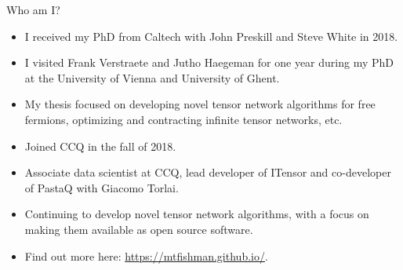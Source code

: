 \begin{frame}{Who am I?}

\begin{itemize}[<+->]

  \item I received my PhD from Caltech with John Preskill and Steve White in 2018.
  \item I visited Frank Verstraete and Jutho Haegeman for one year during my PhD at the University of Vienna and University of Ghent.
  \item My thesis focused on developing novel tensor network algorithms for free fermions, optimizing and contracting infinite tensor networks, etc.
  \item Joined CCQ in the fall of 2018.
  \item Associate data scientist at CCQ, lead developer of ITensor and co-developer of PastaQ with Giacomo Torlai.
  \item Continuing to develop novel tensor network algorithms, with a focus on making them available as open source software.
  \item Find out more here: \url{https://mtfishman.github.io/}.

\end{itemize}

\end{frame}
